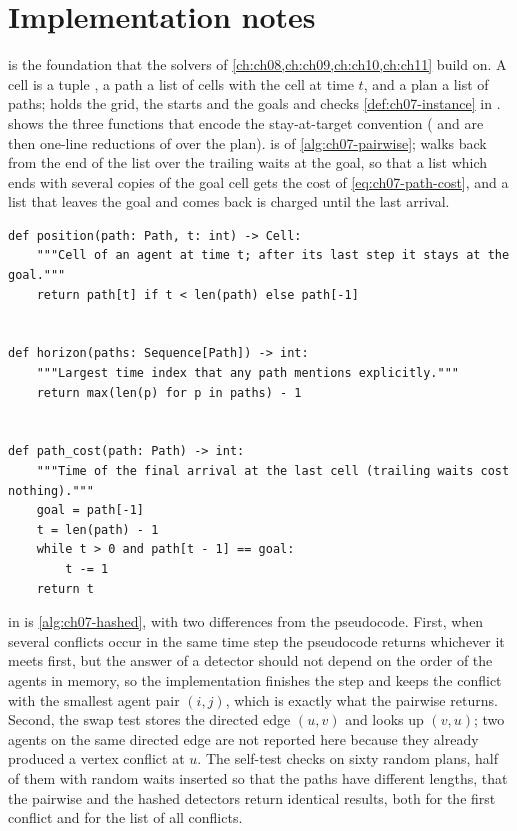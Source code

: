 \section{Implementation notes}
\label{sec:ch07-implementation}

 is the foundation that the solvers of
\cref{ch:ch08,ch:ch09,ch:ch10,ch:ch11} build on. A cell is a tuple
, a path a \python list of cells with  the
cell at time $t$, and a plan a list of paths;  holds the
grid, the starts and the goals and checks \cref{def:ch07-instance} in
.
 shows the three functions that encode the
stay-at-target convention ( and  are then
one-line reductions of  over the plan).  is \MapfPosition of
\cref{alg:ch07-pairwise};  walks back from the end of the
list over the trailing waits at the goal, so that a list which ends with
several copies of the goal cell gets the cost of \cref{eq:ch07-path-cost},
and a list that leaves the goal and comes back is charged until the last
arrival.

\begin{lstlisting}[caption={Positions with stay-at-target padding, the horizon and the path cost (from \code{code/ch07\_mapf.py}).},label={lst:ch07-costs}]
def position(path: Path, t: int) -> Cell:
    """Cell of an agent at time t; after its last step it stays at the goal."""
    return path[t] if t < len(path) else path[-1]


def horizon(paths: Sequence[Path]) -> int:
    """Largest time index that any path mentions explicitly."""
    return max(len(p) for p in paths) - 1


def path_cost(path: Path) -> int:
    """Time of the final arrival at the last cell (trailing waits cost nothing)."""
    goal = path[-1]
    t = len(path) - 1
    while t > 0 and path[t - 1] == goal:
        t -= 1
    return t
\end{lstlisting}

 in  is
\cref{alg:ch07-hashed}, with two differences from the pseudocode. First, when
several conflicts occur in the same time step the pseudocode returns whichever
it meets first, but the answer of a detector should not depend on the order of
the agents in memory, so the implementation finishes the step and keeps the
conflict with the smallest agent pair $(i, j)$, which is exactly what the
pairwise  returns. Second, the swap test stores the
directed edge $(u, v)$ and looks up $(v, u)$; two agents on the same directed
edge are not reported here because they already produced a vertex conflict at
$u$. The self-test checks on sixty random plans, half of them with random
waits inserted so that the paths have different lengths, that the pairwise and
the hashed detectors return identical results, both for the first conflict and
for the list of all conflicts.

